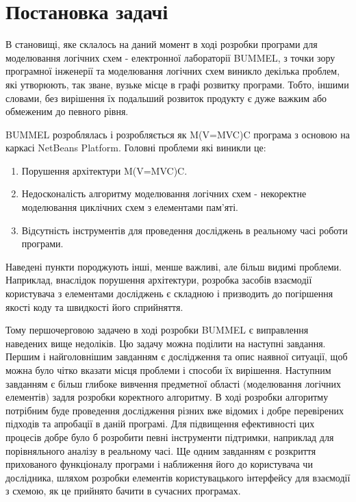 \documentclass[12pt,a4paper]{article}
\begin{document}
\clearpage

\section{Постановка задачі}

В становищі, яке склалось на даний момент в ході розробки програми для моделювання логічних схем - електронної лабораторії BUMMEL, з точки зору програмної інженерії та моделювання логічних схем виникло декілька проблем, які утворюють, так зване, вузьке місце в графі розвитку програми. Тобто, іншими словами, без вирішення їх подальший розвиток продукту є дуже важким або обмеженим до певного рівня.

BUMMEL розроблялась і розробляється як M(V=MVC)C програма з основою на каркасі NetBeans Platform. Головні проблеми які виникли це:
\begin{enumerate}
  \item Порушення архітектури M(V=MVC)C.
  \item Недосконалість алгоритму моделювання логічних схем - некоректне моделювання циклічних схем з елементами пам’яті.
  \item Відсутність інструментів для проведення досліджень в реальному часі роботи програми.
\end{enumerate}

Наведені пункти породжують інші, менше важливі, але більш видимі проблеми. Наприклад, внаслідок порушення архітектури, розробка засобів взаємодії користувача з елементами досліджень є складною і призводить до погіршення якості коду та швидкості його сприйняття.

Тому першочерговою задачею в ході розробки BUMMEL є виправлення наведених вище недоліків. Цю задачу можна поділити на наступні завдання. Першим і найголовнішим завданням є дослідження та опис наявної ситуації, щоб можна було чітко вказати місця проблеми і способи їх вирішення. Наступним завданням є більш глибоке вивчення предметної області (моделювання логічних елементів) задля розробки коректного алгоритму. В ході розробки алгоритму потрібним буде проведення дослідження різних вже відомих і добре перевірених підходів та апробації в даній програмі. Для підвищення ефективності цих процесів добре було б розробити певні інструменти підтримки, наприклад для порівняльного аналізу в реальному часі. Ще одним завданням є розкриття прихованого функціоналу програми і наближення його до користувача чи дослідника, шляхом розробки елементів користувацького інтерфейсу для взаємодії з схемою, як це прийнято бачити в сучасних програмах.
\end{document}
